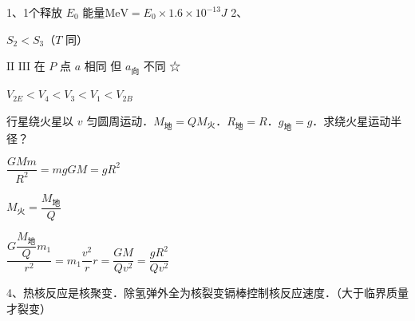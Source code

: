 1、1个释放 $E_0$ 能量\quad $\mathrm{MeV}=E_0\times1.6\times10^{-13}\unit{J}$
2、


$S_2<S_3$（$T$ 同）

$\mathrm{II}$ $\mathrm{III}$ 在 $P$ 点 $a$ 相同 但 $a_{\text{向}}$ 不同 ☆%

$V_{2E}<V_4<V_3<V_1<V_{2B}$
\begin{problem}[3]
行星绕火星以 $v$ 匀圆周运动．$M_{\text{地}}=QM_{\text{火}}$．$R_{\text{地}}=R$．$g_{\text{地}}=g$．求绕火星运动半径？
\begin{solution}
$\dfrac{GMm}{R^2}=mg$\quad $GM=gR^2$

$M_{\text{火}}=\dfrac{M_{\text{地}}}{Q}$

$\dfrac{G\dfrac{M_{\text{地}}}{Q}m_1}{r^2}=m_1\dfrac{v^2}{r}$\quad $r=\dfrac{GM}{Qv^2}=\dfrac{gR^2}{Qv^2}$
\end{solution}
\end{problem}
4、热核反应是核聚变．除氢弹外全为核裂变\quad 镉棒控制核反应速度．（大于临界质量才裂变）


